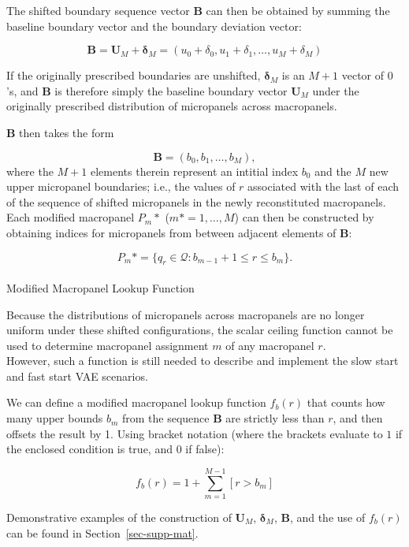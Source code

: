 \documentclass[
  number]{elsarticle}
\makeatletter
\let\oldparagraph\paragraph
\renewcommand{\paragraph}{
    \@ifstar
      \xxxParagraphStar
      \xxxParagraphNoStar
  }
\newcommand{\xxxParagraphStar}[1]{\oldparagraph*{#1}\mbox{}}
\newcommand{\xxxParagraphNoStar}[1]{\oldparagraph{#1}\mbox{}}
\makeatother
\begin{document}
The shifted boundary sequence vector \(\mathbf{B}\) can then be obtained
by summing the baseline boundary vector and the boundary deviation
vector:

\[\mathbf{B} = \mathbf{U}_M + \boldsymbol{\delta}_M = (u_0 + \delta_0, u_1 + \delta_1, \dots, u_M + \delta_M)\]

If the originally prescribed boundaries are unshifted,
\(\boldsymbol{\delta}_M\) is an \(M + 1\) vector of \(0\)'s, and
\(\mathbf{B}\) is therefore simply the baseline boundary vector
\(\mathbf{U}_M\) under the originally prescribed distribution of
micropanels across macropanels.

\(\mathbf{B}\) then takes the form

\[\mathbf{B} = (b_0, b_1, \ldots,b_M),\] where the \(M+1\) elements
therein represent an intitial index \(b_0\) and the \(M\) new upper
micropanel boundaries; i.e., the values of \(r\) associated with the
last of each\\
of the sequence of shifted micropanels in the newly reconstituted
macropanels. Each modified macropanel \(P_m*\) (\(m* = 1,\ldots, M\))
can then be constructed by obtaining indices for micropanels from
between adjacent elements of \(\mathbf{B}\):

\[P_m* = \{ q_r \in \mathcal{Q} : b_{m-1} + 1 \leq r \leq b_m \}.\]

\paragraph{Modified Macropanel Lookup
Function}\label{modified-macropanel-lookup-function}

Because the distributions of micropanels across macropanels are no
longer uniform under these shifted configurations, the scalar ceiling
function cannot be used to determine macropanel assignment \(m\) of any
macropanel \(r\).\\
However, such a function is still needed to describe and implement the
slow start and fast start VAE scenarios.

We can define a modified macropanel lookup function \(f_b(r)\) that
counts how many upper bounds \(b_m\) from the sequence \(\mathbf{B}\)
are strictly less than \(r\), and then offsets the result by 1. Using
bracket notation (where the brackets evaluate to \(1\) if the enclosed
condition is true, and \(0\) if false):

\[f_b(r) = 1 + \sum_{m=1}^{M-1} [r > b_m]\]

Demonstrative examples of the construction of \(\mathbf{U}_M\),
\(\boldsymbol{\delta}_M\), \(\mathbf{B}\), and the use of \(f_b(r)\) can
be found in Section~\ref{sec-supp-mat}.
\end{document}
